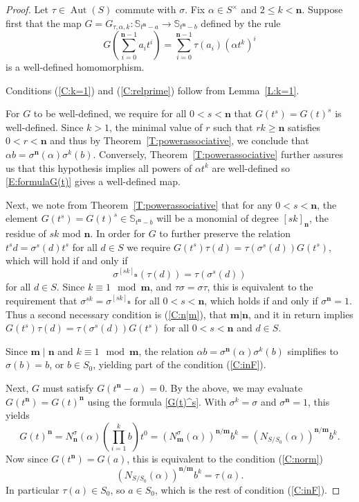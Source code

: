 \documentclass[11pt]{amsart}
\theoremstyle{plain}
\theoremstyle{definition}
\numberwithin{equation}{section}
\numberwithin{figure}{section}
\newcommand{\ring}{S}
\newcommand{\os}{\mathbf{m}}  %
\newcommand{\de}{\mathbf{n}}  %
\DeclareMathOperator{\Aut}{Aut}
\begin{document}
\begin{proof}
Let $\tau\in \Aut(\ring)$ commute with $\sigma$. Fix $\alpha\in \ring^\times$ and  $2\leq k<\de$.  Suppose first that the map $ G=G_{\tau,\alpha,k}:\mathbb{S}_{t^\de -a}\to \mathbb{S}_{t^\de -b}$
defined by the rule
\begin{equation}\label{E:formulaG(t)}
G\left( \sum_{i=0}^{\de-1}a_it^i \right) = \sum_{i=0}^{\de-1}\tau(a_i) (\alpha t^k)^i
\end{equation}
is a well-defined homomorphism.


Conditions (\ref{C:k=1}) and (\ref{C:relprime}) follow from Lemma~\ref{L:k=1}.

For $G$ to be well-defined, we require for all $0<s <\de$ that $G(t^s)=G(t)^s$ is well-defined.  Since $k>1$, the minimal value of $r$ such that $rk\geq \de$ satisfies $0<r<\de$ and thus by Theorem~\ref{T:powerassociative}, we conclude that $\alpha b = \sigma^{\de}(\alpha)\sigma^k(b)$.  Conversely, Theorem~\ref{T:powerassociative} further assures us that this hypothesis implies all powers of $\alpha t^k$ are well-defined so \eqref{E:formulaG(t)} gives a well-defined map.

Next, we note from Theorem~\ref{T:powerassociative} that for any $0<s<\de$, the element $G(t^s)=G(t)^s \in \mathbb{S}_{t^\de -b}$ will be a monomial of degree $[sk]_{\de}$, the residue of $sk$ mod $\de$. In order for $G$ to further preserve the relation $t^sd=\sigma^s(d)t^s$ for all $d\in \ring$ we require $G(t^s)\tau(d) = \tau(\sigma^s(d))G(t^s)$, which will hold if and only if
$$
\sigma^{[sk]_{\de}}(\tau(d))=\tau(\sigma^{s}(d))
$$
for all $d\in \ring$. Since $k\equiv 1 \mod \os$, and $\tau\sigma=\sigma\tau$, this is equivalent to the requirement that $\sigma^{sk}=\sigma^{[sk]_{\de}}$ for all $0<s<\de$, which holds if and only if $\sigma^{\de}=1$.  Thus a second necessary condition is (\ref{C:n|m}), that $\os|\de$, and it in return implies $G(t^s)\tau(d) = \tau(\sigma^s(d))G(t^s)$ for all $0<s<\de$ and $d\in \ring$.


Since $\os\mid\de$ and $k\equiv 1 \mod \os$, the relation $\alpha b = \sigma^{\de}(\alpha)\sigma^k(b)$ simplifies to $\sigma(b)=b$, or $b\in \ring_0$, yielding part of the condition (\ref{C:inF}).

Next, $G$ must satisfy $G(t^{\de}-a)=0$.  By the above, we may evaluate $G(t^{\de})=G(t)^{\de}$ using the formula \eqref{G(t)^s}.  With $\sigma^k=\sigma$ and $\sigma^{\de}=1$, this yields
$$
G(t)^{\de} = N_{\de}^{\sigma}(\alpha)\left(\prod_{i=1}^{k} b\right)t^{0} = (N^\sigma_{\os}(\alpha))^{\de/\os} b^k = (N_{\ring/\ring_0}(\alpha))^{\de/\os}b^k.
$$
Now since $G(t^{\de})=G(a)$, this is equivalent to the condition (\ref{C:norm})
$$
(N_{\ring/\ring_0}(\alpha))^{\de/\os}b^k=\tau(a).
$$
In particular $\tau(a)\in \ring_0$, so $a\in \ring_0$, which is the rest of condition (\ref{C:inF}).


\end{proof}
\end{document}
